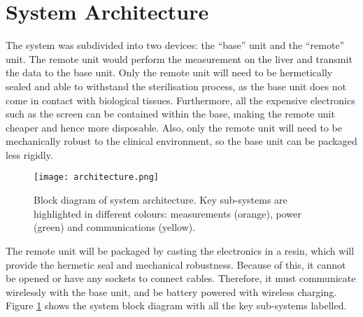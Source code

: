 \section{System Architecture}

The system was subdivided into two devices: the ``base'' unit and the ``remote'' unit. The remote unit would perform the measurement on the liver and transmit the data to the base unit. Only the remote unit will need to be hermetically sealed and able to withstand the sterilisation process, as the base unit does not come in contact with biological tissues. Furthermore, all the expensive electronics such as the screen can be contained within the base, making the remote unit cheaper and hence more disposable. Also, only the remote unit will need to be mechanically robust to the clinical environment, so the base unit can be packaged less rigidly. 



\begin{figure}[htbp]
	\centering
	\texttt{[image: architecture.png]}
	\caption{Block diagram of system architecture. Key sub-systems are highlighted in different colours: measurements (orange), power (green) and communications (yellow).}
	\label{fig: architecture}
\end{figure}

The remote unit will be packaged by casting the electronics in a resin, which will provide the hermetic seal and mechanical robustness. Because of this, it cannot be opened or have any sockets to connect cables. Therefore, it must communicate wirelessly with the base unit, and be battery powered with wireless charging. Figure \ref{fig: architecture} shows the system block diagram with all the key sub-systems labelled.
